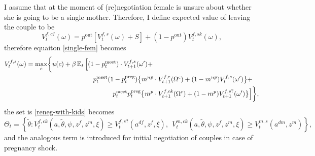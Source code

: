 I assume that at the moment of (re)negotiation female is unsure about whether she is going to be a single mother. Therefore, I define expected value of leaving the couple to be
\[V_t^{f,c?}(\omega) = p^{\text{out}}[V_t^{f,s}(\omega) + S] + (1-p^{\text{out}})V_t^{f,sk}(\omega),\]
therefore equaiton \ref{single-fem} becomes
\begin{align}V^{f,s}_t(\omega) = \max\limits_{c} & \bigg\{ u(c) + \beta \E_t \Big[ (1 - p^{\text{meet}}_t)\cdot V^{f,s}_{t+1}(\omega') + \label{single-fem-true} \\  \nonumber
& \hspace{7em} p^{\text{meet}}_t (1-p^{\text{preg}}_t) \big\{ m^{np} \cdot V^{f,c}_{t+1}(\Omega^c) + (1-m^{np})V^{f,s}_t(\omega')\big\} + \\  \nonumber
& \hspace{10em} p^{\text{meet}}_t p^{\text{preg}}_t \big\{ m^{p} \cdot V^{f,ck}_{t+1}(\Omega^c) + (1-m^{p})V^{f,s?}_{t+1}(\omega')\big\}  \Big]  \bigg\},
\end{align}
the set is \ref{reneg-with-kids} becomes
\begin{equation}\Theta_t = \left\{ \tilde\theta : V^{f,ck}_t(a,\tilde\theta,\psi,z^f,z^m,\xi) \geq V_t^{f,s?}(a^{df},z^f,\xi) , \ \ V_t^{m,ck}(a,\tilde\theta,\psi,z^f,z^m,\xi)\geq V_t^{m,s}(a^{dm},z^m) \right\} \label{reneg-with-kids}
,\end{equation}
and the analogous term is introduced for initial negotiation of couples in case of pregnancy shock.
